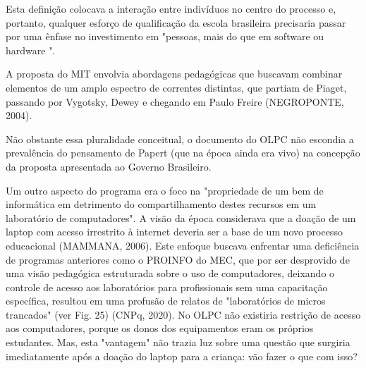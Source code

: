 Esta definição colocava a interação entre indivíduos no centro do processo e, portanto, qualquer esforço de qualificação da escola brasileira precisaria passar por uma ênfase no investimento em "pessoas, mais do que em software ou hardware ".

A proposta do MIT envolvia abordagens pedagógicas que buscavam combinar elementos de um amplo espectro de correntes distintas, que partiam de Piaget, passando por Vygotsky, Dewey e chegando em Paulo Freire  (NEGROPONTE, 2004).

Não obstante essa pluralidade conceitual, o documento do OLPC não escondia a prevalência do pensamento de Papert (que na época ainda era vivo) na concepção da proposta apresentada ao Governo Brasileiro.


\noindent\begin{flushright}\mbox{\linespread{1}\selectfont\centering{}}\end{flushright}


Um outro aspecto do programa era o foco na "propriedade de um bem de informática em detrimento do compartilhamento destes recursos em um laboratório de computadores". A visão da época considerava que a doação de um laptop com acesso irrestrito à internet deveria ser a base de um novo processo educacional (MAMMANA, 2006). Este enfoque buscava enfrentar uma deficiência de programas anteriores como o PROINFO do MEC, que por ser desprovido de uma visão pedagógica estruturada sobre o uso de computadores, deixando o controle de acesso aos laboratórios para profissionais sem uma capacitação específica, resultou em uma profusão de relatos de "laboratórios de micros trancados" (ver Fig. 25)  (CNPq, 2020). No OLPC não existiria restrição de acesso aos computadores, porque os donos dos equipamentos eram os próprios estudantes. Mas, esta "vantagem" não trazia luz sobre  uma questão que surgiria imediatamente após a doação do laptop para a criança: vão fazer o que com isso?



